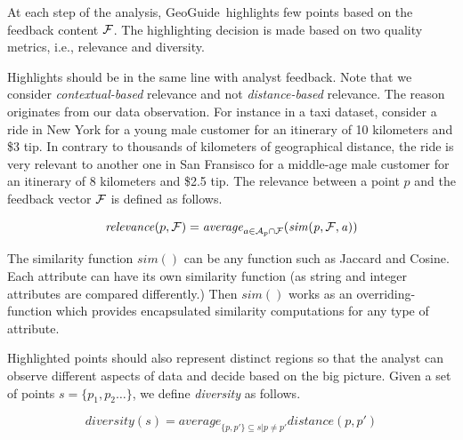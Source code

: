 \documentclass[conference,compsoc]{IEEEtran}
\newtheorem{definition}{Definition}
\newcommand{\framework}{{\sc GeoGuide}}
\begin{document}
At each step of the analysis, \framework\ highlights few points based on the feedback content ${\cal F}$. The highlighting decision is made based on two quality metrics, i.e., relevance and diversity. 

\vspace{5pt}
 Highlights should be in the same line with analyst feedback.
Note that we consider {\em contextual-based} relevance and not {\em distance-based} relevance. The reason originates from our data observation. For instance in a taxi dataset, consider a ride in New York for a young male customer for an itinerary of 10 kilometers and \$3 tip. In contrary to thousands of kilometers of geographical distance, the ride is very relevant to another one in San Fransisco for a middle-age male customer for an itinerary of 8 kilometers and \$2.5 tip. The relevance between a point $p$ and the feedback vector ${\cal F}$ is defined as follows.


\begin{dmath}
	\label{eq:rel}
	\mathit{relevance}(p,{\cal F}) = \mathit{average}_{a \in {\cal A}_{p} \cap {\cal F}}(\mathit{sim(p, {\cal F}, a)})
\end{dmath}

The similarity function $\mathit{sim}()$ can be any function such as Jaccard and Cosine. Each attribute can have its own similarity function (as string and integer attributes are compared differently.) Then $\mathit{sim}()$ works as an overriding-function which provides encapsulated similarity computations for any type of attribute.

\vspace{5pt}
 Highlighted points should also represent distinct regions so that the analyst can observe different aspects of data and decide based on the big picture. Given a set of points $s = \{ p_1, p_2 \dots \}$, we define {\em diversity} as follows.

\begin{dmath}
	\label{eq:divs}
	\mathit{diversity}(s) = \mathit{average}_{\{p, p'\} \subseteq s | p \neq p' } \mathit{distance}(p,p')
\end{dmath} 
\end{document}
